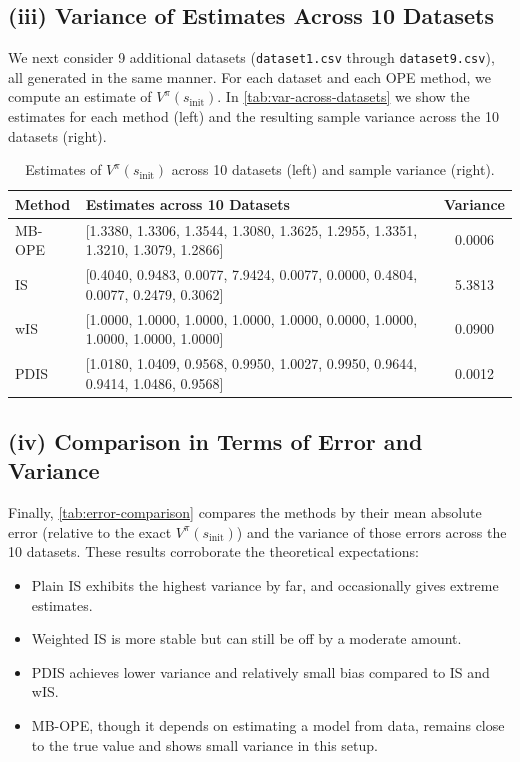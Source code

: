 \subsection*{(iii) Variance of Estimates Across 10 Datasets}
We next consider 9 additional datasets (\texttt{dataset1.csv} through \texttt{dataset9.csv}), all generated in the same manner. For each dataset and each OPE method, we compute an estimate of $V^\pi(s_{\text{init}})$. In \autoref{tab:var-across-datasets} we show the estimates for each method (left) and the resulting sample variance across the 10 datasets (right).  

\begin{table}[h!]
    \centering
    \begin{tabular}{l|p{6cm}|c}
    \hline
    \textbf{Method} & \textbf{Estimates across 10 Datasets} & \textbf{Variance} \\
    \hline
    MB-OPE & 
    [1.3380, 1.3306, 1.3544, 1.3080, 1.3625, 1.2955, 1.3351, 1.3210, 1.3079, 1.2866] & 
    0.0006 \\
    IS & 
    [0.4040, 0.9483, 0.0077, 7.9424, 0.0077, 0.0000, 0.4804, 0.0077, 0.2479, 0.3062] &
    5.3813 \\
    wIS &
    [1.0000, 1.0000, 1.0000, 1.0000, 1.0000, 0.0000, 1.0000, 1.0000, 1.0000, 1.0000] &
    0.0900 \\
    PDIS &
    [1.0180, 1.0409, 0.9568, 0.9950, 1.0027, 0.9950, 0.9644, 0.9414, 1.0486, 0.9568] &
    0.0012 \\
    \hline
    \end{tabular}
    \caption{Estimates of $V^\pi(s_{\text{init}})$ across 10 datasets (left) and sample variance (right).}
    \label{tab:var-across-datasets}
\end{table}

\subsection*{(iv) Comparison in Terms of Error and Variance}
Finally, \autoref{tab:error-comparison} compares the methods by their mean absolute error (relative to the exact $V^\pi(s_{\text{init}})$) and the variance of those errors across the 10 datasets. These results corroborate the theoretical expectations:
\begin{itemize}
    \item Plain IS exhibits the highest variance by far, and occasionally gives extreme estimates.
    \item Weighted IS is more stable but can still be off by a moderate amount.
    \item PDIS achieves lower variance and relatively small bias compared to IS and wIS.
    \item MB-OPE, though it depends on estimating a model from data, remains close to the true value and shows small variance in this setup.
\end{itemize}

